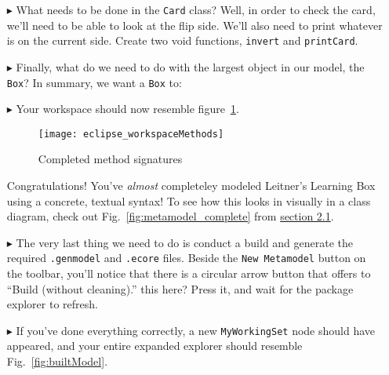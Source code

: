 \begin{itemize}
\item[$\blacktriangleright$] What needs to be done in the \texttt{Card} class? Well, in order to check the card, we'll need to be able to look at the flip side.
We'll also need to print whatever is on the current side. Create two void functions, \texttt{invert} and \texttt{printCard}.

\item[$\blacktriangleright$] Finally, what do we need to do with the largest object in our model, the \texttt{Box}? In summary, we want a \texttt{Box} to:



\item[$\blacktriangleright$] Your workspace should now resemble figure~\ref{fig:workspaceMethods}.
\begin{figure}[htbp]
	\centering
  \texttt{[image: eclipse\_workspaceMethods]}
	\caption{Completed method signatures}
	\label{fig:workspaceMethods}
\end{figure}


Congratulations! You've \emph{almost} completeley modeled Leitner's Learning Box using a concrete, textual syntax! To see how this looks in visually in a class
diagram, check out Fig.~\ref{fig:metamodel_complete} from \hyperlink{sec:static vis}{section 2.1}.

\item[$\blacktriangleright$]The very last thing we need to do is conduct a build and generate the required \texttt{.genmodel} and \texttt{.ecore} files. Beside
the \texttt{New Metamodel} button on the toolbar, you'll notice that there is a circular arrow button that offers to ``Build (without cleaning).''   %
this here? Press it, and wait for the package explorer to refresh.

\item[$\blacktriangleright$] If you've done everything correctly, a new \texttt{MyWorkingSet} node should have appeared, and your entire expanded explorer
should resemble Fig.~\ref{fig:builtModel}.


\end{itemize}
